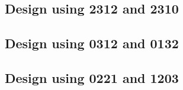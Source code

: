 \subsection{Design using 2312 and 2310}


 \begin{center}




 \end{center}



\subsection{Design using 0312 and 0132}


 \begin{center}




 \end{center}



\subsection{Design using 0221 and 1203}


 \begin{center}




 \end{center}



